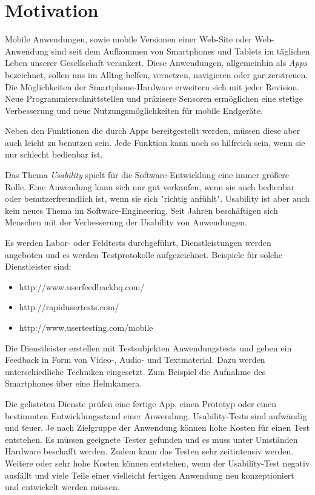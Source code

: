 \section{Motivation}

Mobile Anwendungen, sowie mobile Versionen einer Web-Site oder Web-Anwendung sind seit dem Aufkommen von Smartphones und Tablets im täglichen Leben unserer Gesellschaft verankert. Diese Anwendungen, allgemeinhin als \textit{Apps} bezeichnet, sollen uns im Alltag helfen, vernetzen, navigieren oder gar zerstreuen. Die Möglichkeiten der Smartphone-Hardware erweitern sich mit jeder Revision. Neue Programmierschnittstellen und präzisere Sensoren ermöglichen eine stetige Verbesserung und neue Nutzungsmöglichkeiten für mobile Endgeräte. 

Neben den Funktionen die durch Apps bereitgestellt werden, müssen diese aber auch leicht zu benutzen sein. Jede Funktion kann noch so hilfreich sein, wenn sie nur schlecht bedienbar ist. 

Das Thema \textit{Usability} spielt für die Software-Entwicklung eine immer größere Rolle. Eine Anwendung kann sich nur gut verkaufen, wenn sie auch bedienbar oder benutzerfreundlich ist, wenn sie sich "richtig anfühlt". Usability ist aber auch kein neues Thema im Software-Engineering. Seit Jahren beschäftigen sich Menschen mit der Verbesserung der Usability von Anwendungen.

Es werden Labor- oder Feldtests durchgeführt, Dienstleistungen werden angeboten und es werden Testprotokolle aufgezeichnet. Beispiele für solche Dienstleister sind: 

\begin{itemize}
    \item{http://www.userfeedbackhq.com/}
    \item{http://rapidusertests.com/}
    \item{http://www.usertesting.com/mobile}
\end{itemize}

Die Dienstleister erstellen mit Testsubjekten Anwendungstests und geben ein Feedback in Form von Video-, Audio- und Textmaterial. Dazu werden unterschiedliche Techniken eingesetzt. Zum Beispiel die Aufnahme des Smartphones über eine Helmkamera. 

Die gelisteten Dienste prüfen eine fertige App, einen Prototyp oder einen bestimmten Entwicklungsstand einer Anwendung. Usability-Tests sind aufwändig und teuer. Je nach Zielgruppe der Anwendung können hohe Kosten für einen Test entstehen. Es müssen geeignete Tester gefunden und es muss unter Umständen Hardware beschafft werden. Zudem kann das Testen sehr zeitintensiv werden. Weitere oder sehr hohe Kosten können entstehen, wenn der Usability-Test negativ ausfällt und viele Teile einer vielleicht fertigen Anwendung neu konzeptioniert und entwickelt werden müssen. 

